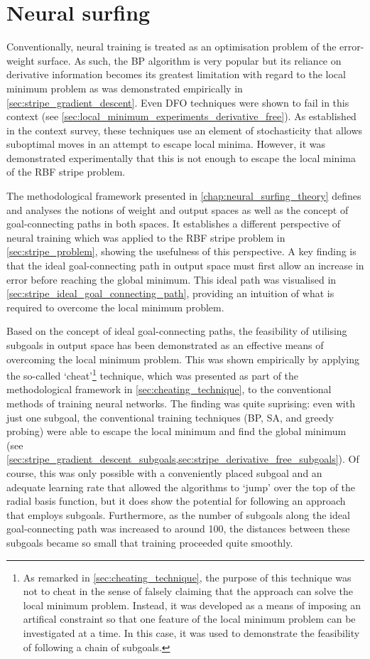 \section{Neural surfing}
\label{sec:eval_neural_surfing}
Conventionally, neural training is treated as an optimisation problem of the error-weight surface.
As such, the BP algorithm is very popular but its reliance on derivative information becomes its greatest limitation with regard to the local minimum problem as was demonstrated empirically in \ref{sec:stripe_gradient_descent}.
Even DFO techniques were shown to fail in this context (see \ref{sec:local_minimum_experiments_derivative_free}).
As established in the context survey, these techniques use an element of stochasticity that allows suboptimal moves in an attempt to escape local minima.
However, it was demonstrated experimentally that this is not enough to escape the local minima of the RBF stripe problem.

The methodological framework presented in \ref{chap:neural_surfing_theory} defines and analyses the notions of weight and output spaces as well as the concept of goal-connecting paths in both spaces.
It establishes a different perspective of neural training which was applied to the RBF stripe problem in \ref{sec:stripe_problem}, showing the usefulness of this perspective.
A key finding is that the ideal goal-connecting path in output space must first allow an increase in error before reaching the global minimum.
This ideal path was visualised in \ref{sec:stripe_ideal_goal_connecting_path}, providing an intuition of what is required to overcome the local minimum problem.

Based on the concept of ideal goal-connecting paths, the feasibility of utilising subgoals in output space has been demonstrated as an effective means of overcoming the local minimum problem.
This was shown empirically by applying the so-called `cheat'\footnote{As remarked in \ref{sec:cheating_technique}, the purpose of this technique was not to cheat in the sense of falsely claiming that the approach can solve the local minimum problem. Instead, it was developed as a means of imposing an artifical constraint so that one feature of the local minimum problem can be investigated at a time. In this case, it was used to demonstrate the feasibility of following a chain of subgoals.} technique, which was presented as part of the methodological framework in \ref{sec:cheating_technique}, to the conventional methods of training neural networks.
The finding was quite suprising: even with just one subgoal, the conventional training techniques (BP, SA, and greedy probing) were able to escape the local minimum and find the global minimum (see \ref{sec:stripe_gradient_descent_subgoals,sec:stripe_derivative_free_subgoals}).
Of course, this was only possible with a conveniently placed subgoal and an adequate learning rate that allowed the algorithms to `jump' over the top of the radial basis function, but it does show the potential for following an approach that employs subgoals.
Furthermore, as the number of subgoals along the ideal goal-connecting path was increased to around 100, the distances between these subgoals became so small that training proceeded quite smoothly.

